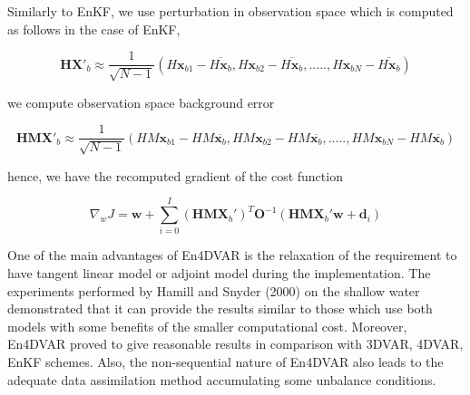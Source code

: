 \documentclass[a4,12pt]{article}
\begin{document}
Similarly to EnKF, we use perturbation in observation space which is computed as follows in the case of EnKF,

$$\textbf{HX}'_{b} \approx \frac{1}{\sqrt{N-1}}(H\textbf{x}_{b1}-\overline{H\textbf{x}_{b}},H\textbf{x}_{b2}-\overline{H\textbf{x}_{b}},.....,H\textbf{x}_{bN}-\overline{H\textbf{x}_{b}})$$

we compute observation space background error

$$\textbf{HMX}'_{b} \approx \frac{1}{\sqrt{N-1}}(HM\textbf{x}_{b1}-HM\overline{\textbf{x}_{b}}, HM\textbf{x}_{b2}-HM\overline{\textbf{x}_{b}},.....,HM\textbf{x}_{bN}-HM\overline{\textbf{x}_{b}} )$$

hence, we have the recomputed gradient of the cost function

$$\nabla _{w}J = \textbf{w} + \sum_{i=0}^{I}(\textbf{HMX}_{b}')^{T}\textbf{O}^{-1}(\textbf{HMX}_{b}'\textbf{w}+\textbf{d}_{i})$$


One of the main advantages of En4DVAR is the relaxation of the requirement to have tangent linear model or adjoint model during the implementation. The experiments performed by Hamill and Snyder (2000) on the shallow water demonstrated that it can  provide the results similar to those which use both models with some benefits of the smaller computational cost. Moreover, En4DVAR proved to give reasonable results in comparison with 3DVAR, 4DVAR, EnKF schemes. Also, the non-sequential nature of En4DVAR also leads to the adequate data assimilation method accumulating some unbalance conditions.  
\end{document}
